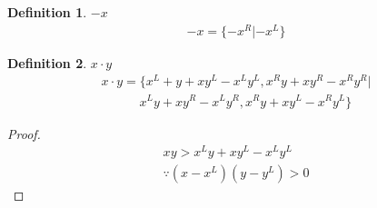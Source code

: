 \documentclass[10pt,a4paper]{book}
\newtheorem{myDef}{Definition}
\begin{document}
	\begin{myDef}
		$ -x $\\
		\begin{gather*}
			-x = \{ -x^R | -x^L \}
		\end{gather*}
	\end{myDef}
	
	\begin{myDef}
		$x\cdot y$\\
		\begin{gather*}
			x\cdot y = \{x^L+y+xy^L-x^Ly^L, x^Ry+xy^R-x^Ry^R|\\
			\qquad\quad x^Ly+xy^R-x^Ly^R, x^Ry+xy^L-x^Ry^L\}
		\end{gather*}
	\end{myDef}
	
	\begin{proof}
		\begin{gather}
			xy>x^Ly+xy^L-x^Ly^L\\
			\because	(x-x^L)(y-y^L)>0
		\end{gather}
	\end{proof}
\end{document}
